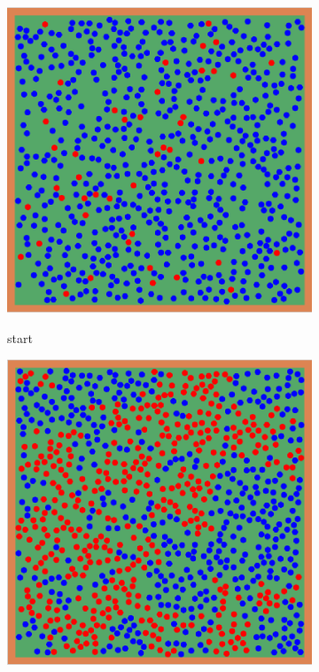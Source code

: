 \begin{figure}[H]
    \centering
   \begin{subfigure}{0.3\textwidth}
\includegraphics[width=\textwidth]{images/task4.5_start.png}
    \label{fig:start}
    \caption{start}
\end{subfigure}
   \begin{subfigure}{0.3\textwidth}
\includegraphics[width=\textwidth]{images/task4.5_mid.png}

\end{subfigure}
\end{figure}
